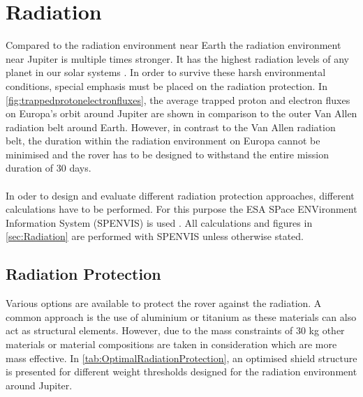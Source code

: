 \section{Radiation} \label{sec:Radiation}

Compared to the radiation environment near Earth the radiation environment near Jupiter is multiple times stronger. It has the highest radiation levels of any planet in our solar systems \cite{JupiterRadiationEnvironment}. In order to survive these harsh environmental conditions, special emphasis must be placed on the radiation protection. In \autoref{fig:trappedprotonelectronfluxes}, the average trapped proton and electron fluxes on Europa's orbit around Jupiter are shown in comparison to the outer Van Allen radiation belt around Earth. However, in contrast to the Van Allen radiation belt, the duration within the radiation environment on Europa cannot be minimised and the rover has to be designed to withstand the entire mission duration of 30 days. \\ \\
In oder to design and evaluate different radiation protection approaches, different calculations have to be performed. For this purpose the ESA SPace ENVironment Information System (SPENVIS) is used \cite{Spenvis}. All calculations and figures in \autoref{sec:Radiation} are performed with SPENVIS unless otherwise stated.

\subsection{Radiation Protection}

\label{subsec:RadiationProtection}

Various options are available to protect the rover against the radiation. A common approach is the use of aluminium or titanium as these materials can also act as structural elements. However, due to the mass constraints of 30 kg other materials or material compositions are taken in consideration which are more mass effective. In \autoref{tab:OptimalRadiationProtection}, an optimised shield structure is presented for different weight thresholds designed for the radiation environment around Jupiter.

